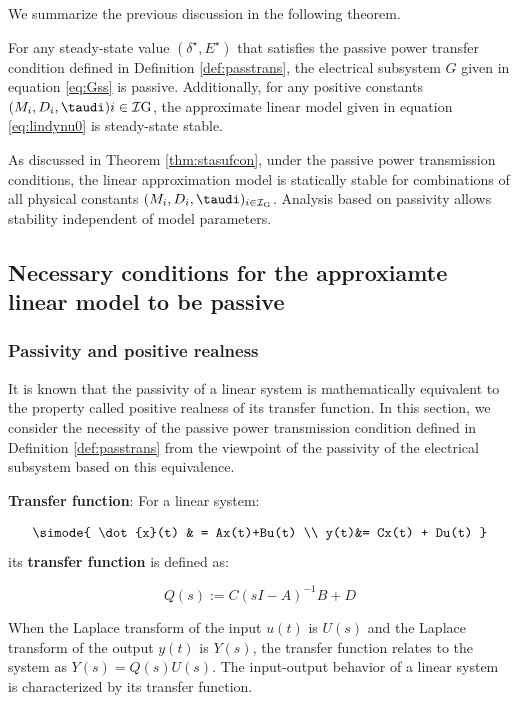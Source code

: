 \documentclass[graybox, envcountchap]{svmult}
\begin{document}
We summarize the previous discussion in the following theorem.

\begin{theorem}\label{thm:stasufcon}
For any steady-state value $(\delta^{\star},E^{\star})$ that satisfies the
passive power transfer condition defined in Definition \ref{def:passtrans}, the
electrical subsystem $G$ given in equation \ref{eq:Gss} is passive.
Additionally, for any positive constants $(M_i,D_i,\taudi ){i \in
\mathcal{I}{\rm G}}$, the approximate linear model given in equation
\ref{eq:lindynu0} is steady-state stable.
\end{theorem}

As discussed in Theorem \ref{thm:stasufcon}, under the passive power
transmission conditions, the linear approximation model is statically stable for
combinations of all physical constants $(M_i,D_i,\taudi )_{i \in
\mathcal{I}_{\rm G}}$.  Analysis based on passivity allows stability independent
of model parameters.

\subsection{Necessary conditions for the approxiamte linear model to be
passive}\label{sec:nesconana}

\smallskip
\subsubsection{Passivity and positive realness}

It is known that the passivity of a linear system is mathematically equivalent
to the property called positive realness of its transfer function. In this
section, we consider the necessity of the passive power transmission condition
defined in Definition \ref{def:passtrans} from the viewpoint of the passivity of
the electrical subsystem based on this equivalence.

\begin{COLUMN}
\noindent \textbf{Transfer function}:
For a linear system:

\begin{equation*}
  \simode{
    \dot{x}(t) & = Ax(t)+Bu(t) \\
    y(t)&= Cx(t) + Du(t)
  }
\end{equation*}
its \textbf{transfer function} is defined as:

\[
  Q(s):=C(sI-A)^{-1}B +D
\]

When the Laplace transform of the input $u(t)$ is $U(s)$ and the Laplace
transform of the output $y(t)$ is $Y(s)$, the transfer function relates to the
system as $Y(s)=Q(s)U(s)$. The input-output behavior of a linear system is
characterized by its transfer function.
\end{COLUMN}
\end{document}
